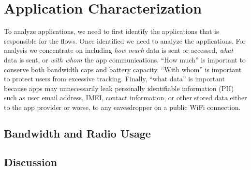 \section{Application Characterization}
\label{sec:characterize-app}

To analyze applications, we need to first identify the applications that is responsible for the flows. 
Once identified we need to analyze the applications. 
For analysis we concentrate on including {\it how much} data is sent or accessed, {\it what} data is sent,  or {\it with whom} the app communications.
``How much'' is important to conserve both bandwidth caps and battery capacity.
``With whom'' is important to protect users from excessive tracking.
Finally, ``what data'' is important because apps may unnecessarily leak personally identifiable information (PII) such as user email address, IMEI, contact information, or other stored data either to the app provider or worse, to any eavesdropper on a public WiFi connection.

\subsection{Bandwidth and Radio Usage}

\subsection{Discussion}












